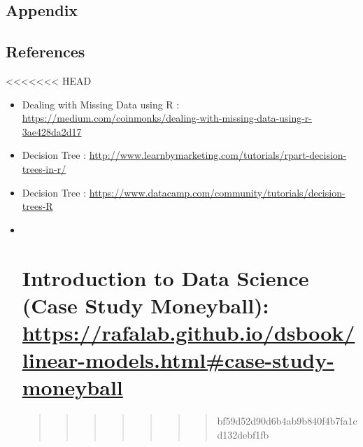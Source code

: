 \documentclass[
]{article}
\begin{document}
\hypertarget{appendix}{%
\subsection{Appendix}\label{appendix}}

\hypertarget{references}{%
\subsection{References}\label{references}}

\textless\textless\textless\textless\textless\textless\textless{} HEAD

\begin{itemize}
\item
  Dealing with Missing Data using R :
  \url{https://medium.com/coinmonks/dealing-with-missing-data-using-r-3ae428da2d17}
\item
  Decision Tree :
  \url{http://www.learnbymarketing.com/tutorials/rpart-decision-trees-in-r/}
\item
  Decision Tree :
  \url{https://www.datacamp.com/community/tutorials/decision-trees-R}
\item ~
  \hypertarget{introduction-to-data-science-case-study-moneyball-httpsrafalab.github.iodsbooklinear-models.htmlcase-study-moneyball}{%
  \section{\texorpdfstring{Introduction to Data Science (Case Study
  Moneyball):
  \url{https://rafalab.github.io/dsbook/linear-models.html\#case-study-moneyball}}{Introduction to Data Science (Case Study Moneyball): https://rafalab.github.io/dsbook/linear-models.html\#case-study-moneyball}}\label{introduction-to-data-science-case-study-moneyball-httpsrafalab.github.iodsbooklinear-models.htmlcase-study-moneyball}}

  \begin{quote}
  \begin{quote}
  \begin{quote}
  \begin{quote}
  \begin{quote}
  \begin{quote}
  \begin{quote}
  bf59d52d90d6b4ab9b840f4b7fa1cd132debf1fb
  \end{quote}
  \end{quote}
  \end{quote}
  \end{quote}
  \end{quote}
  \end{quote}
  \end{quote}
\end{itemize}
\end{document}
